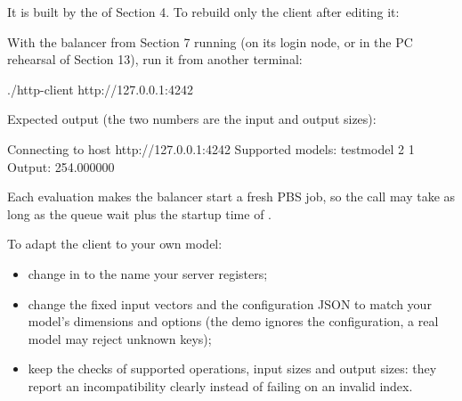 \documentclass[
  11pt,
  a4paper,
]{article}
\newenvironment{Shaded}{}{}
\newcommand{\AttributeTok}[1]{\textcolor[rgb]{0.49,0.56,0.16}{#1}}
\newcommand{\BuiltInTok}[1]{\textcolor[rgb]{0.00,0.50,0.00}{#1}}
\newcommand{\ExtensionTok}[1]{#1}
\newcommand{\FunctionTok}[1]{\textcolor[rgb]{0.02,0.16,0.49}{#1}}
\newcommand{\NormalTok}[1]{#1}
\newcommand{\StringTok}[1]{\textcolor[rgb]{0.25,0.44,0.63}{#1}}
\newcommand{\VariableTok}[1]{\textcolor[rgb]{0.10,0.09,0.49}{#1}}
\providecommand{\tightlist}{%
  \setlength{\itemsep}{0pt}\setlength{\parskip}{0pt}}
\DeclareRobustCommand{\InlineCode}[1]{{\ttfamily\upshape\seqsplit{#1}}}
\renewenvironment{Shaded}{\begin{snugshade}}{\end{snugshade}}
\begin{document}
It is built by the \InlineCode{make} of Section 4. To rebuild only the
client after editing it:


\begin{Shaded}
\end{Shaded}

With the balancer from Section 7 running (on its login node, or in the
PC rehearsal of Section 13), run it from another terminal:


\begin{Shaded}
\begin{Highlighting}[]
\ExtensionTok{./http{-}client}\NormalTok{ http://127.0.0.1:4242}
\end{Highlighting}
\end{Shaded}

Expected output (the two numbers are the input and output sizes):


\begin{Shaded}
\begin{Highlighting}[]
\NormalTok{Connecting to host http://127.0.0.1:4242}
\NormalTok{Supported models:}
\NormalTok{  testmodel}
\NormalTok{2}
\NormalTok{1}
\NormalTok{Output: 254.000000}
\end{Highlighting}
\end{Shaded}

Each evaluation makes the balancer start a fresh PBS job, so the call
may take as long as the queue wait plus the startup time of
\InlineCode{job.sh}.

To adapt the client to your own model:

\begin{itemize}
\tightlist
\item
  change \InlineCode{model\_name} in \InlineCode{main()} to the name
  your server registers;
\item
  change the fixed input vectors and the configuration JSON to match
  your model's dimensions and options (the demo ignores the
  configuration, a real model may reject unknown keys);
\item
  keep the checks of supported operations, input sizes and output sizes:
  they report an incompatibility clearly instead of failing on an
  invalid index.
\end{itemize}
\end{document}
